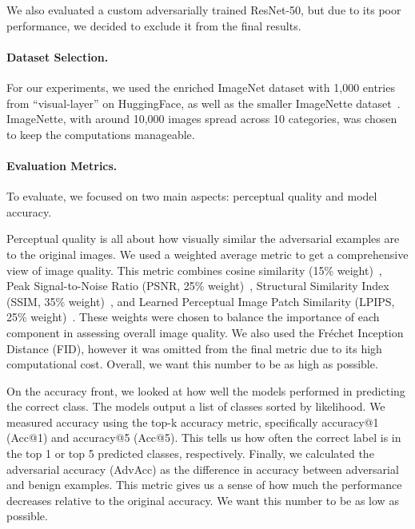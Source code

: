 \documentclass[a4paper, oneside]{discothesis}
\begin{document}
We also evaluated a custom adversarially trained ResNet-50, but due to its poor performance, we decided to exclude it from the final results.

\paragraph{Dataset Selection.}

For our experiments, we used the enriched ImageNet dataset with 1,000 entries from ``visual-layer'' on HuggingFace, as well as the smaller ImageNette dataset~\cite{Howard_Imagenette_2019}. ImageNette, with around 10,000 images spread across 10 categories, was chosen to keep the computations manageable.

\paragraph{Evaluation Metrics.}

To evaluate, we focused on two main aspects: perceptual quality and model accuracy.

Perceptual quality is all about how visually similar the adversarial examples are to the original images. We used a weighted average metric to get a comprehensive view of image quality. This metric combines cosine similarity (15\% weight)~\cite{singhal2001modern}, Peak Signal-to-Noise Ratio (PSNR, 25\% weight)~\cite{9311108}, Structural Similarity Index (SSIM, 35\% weight)~\cite{wang2004image}, and Learned Perceptual Image Patch Similarity (LPIPS, 25\% weight)~\cite{lpips}. These weights were chosen to balance the importance of each component in assessing overall image quality. We also used the Fréchet Inception Distance (FID), however it was omitted from the final metric due to its high computational cost. Overall, we want this number to be as high as possible.

On the accuracy front, we looked at how well the models performed in predicting the correct class. The models output a list of classes sorted by likelihood. We measured accuracy using the top-k accuracy metric, specifically accuracy@1 (Acc@1) and accuracy@5 (Acc@5). This tells us how often the correct label is in the top 1 or top 5 predicted classes, respectively. Finally, we calculated the adversarial accuracy (AdvAcc) as the difference in accuracy between adversarial and benign examples. This metric gives us a sense of how much the performance decreases relative to the original accuracy. We want this number to be as low as possible.
\end{document}
